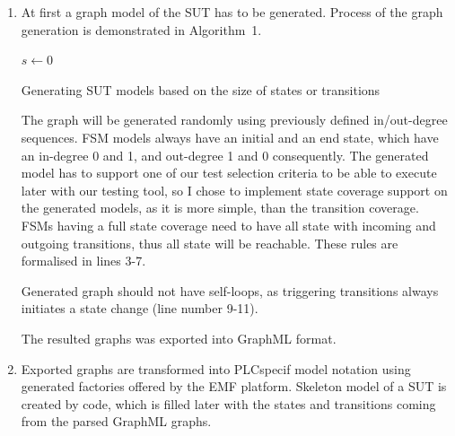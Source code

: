 \begin{enumerate}
	\item At first a graph model of the SUT has to be generated. Process of the graph generation is demonstrated in Algorithm~1.
	
\begin{algorithm}
\label{alg:sutmodelgeneration}
\SetAlgoLined
{}
$s \leftarrow 0$\;
\caption{Generating SUT models based on the size of states or transitions}
\end{algorithm}

	The graph will be generated randomly using previously defined in/out-degree sequences. FSM models always have an initial and an end state, which have an in-degree 0 and 1, and out-degree 1 and 0 consequently. The generated model has to support one of our test selection criteria to be able to execute later with our testing tool, so I chose to implement state coverage support on the generated models, as it is more simple, than the transition coverage. FSMs having a full state coverage need to have all state with incoming and outgoing transitions, thus all state will be reachable. These rules are formalised in lines 3-7.
	
	Generated graph should not have self-loops, as triggering transitions always initiates a state change (line number 9-11).
	
	The resulted graphs was exported into GraphML format.
	
	\item  Exported graphs are transformed into PLCspecif model notation using generated factories offered by the EMF platform. Skeleton model of a SUT is created by code, which is filled later with the states and transitions coming from the parsed GraphML graphs.
	
\end{enumerate}

